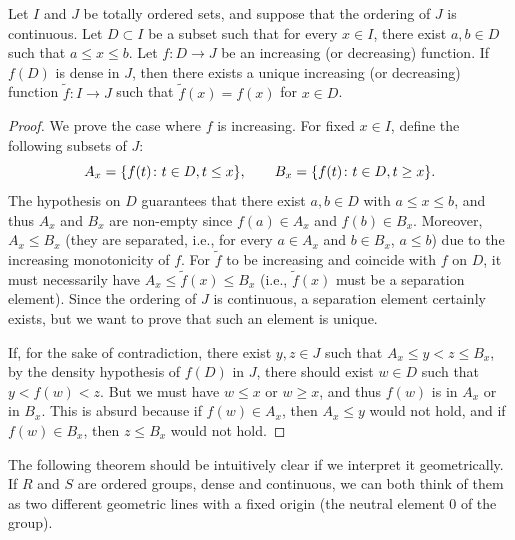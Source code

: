 \begin{theorem}
  \label{th:estensione_monotona}
Let $I$ and $J$ be totally ordered sets, and suppose that the ordering of $J$ is
continuous. Let $D\subset I$ be a subset such that for every $x \in I$, there
exist $a,b\in D$ such that $a\le x\le b$. Let $f\colon D\to J$ be an increasing
(or decreasing) function. If $f(D)$ is dense in $J$, then there exists a unique
increasing (or decreasing) function $\tilde f\colon I\to J$ such that $\tilde
f(x) = f(x)$ for $x\in D$.
\end{theorem}
\begin{proof}
We prove the case where $f$ is increasing. For fixed $x\in I$, define the
following subsets of $J$:
\[
  A_x = {\left\{ f(t)\colon t\in D, t\le x \right\}},
  \qquad
  B_x = {\left\{ f(t)\colon t\in D, t\ge x \right\}}.
\]
The hypothesis on $D$ guarantees that there exist $a,b\in D$ with $a\le x \le
b$, and thus $A_x$ and $B_x$ are non-empty since $f(a)\in A_x$ and $f(b)\in
B_x$. Moreover, $A_x \le B_x$ (they are separated, i.e., for every $a\in A_x$
and $b\in B_x$, $a\le b$) due to the increasing monotonicity of $f$. For $\tilde
f$ to be increasing and coincide with $f$ on $D$, it must necessarily have $A_x
\le \tilde f(x) \le B_x$ (i.e., $\tilde f(x)$ must be a separation element).
Since the ordering of $J$ is continuous, a separation element certainly exists,
but we want to prove that such an element is unique.

If, for the sake of contradiction, there exist $y,z\in J$ such that $A_x\le
y<z\le B_x$, by the density hypothesis of $f(D)$ in $J$, there should exist
$w\in D$ such that $y<f(w)<z$. But we must have $w\le x$ or $w\ge x$, and thus
$f(w)$ is in $A_x$ or in $B_x$. This is absurd because if $f(w)\in A_x$, then
$A_x\le y$ would not hold, and if $f(w)\in B_x$, then $z\le B_x$ would not hold.
\end{proof}

% 
% 
The following theorem should be intuitively clear if we interpret it
geometrically. If $R$ and $S$ are ordered groups, dense and continuous, we can
both think of them as two different geometric lines with a fixed origin (the
neutral element $0$ of the group).

